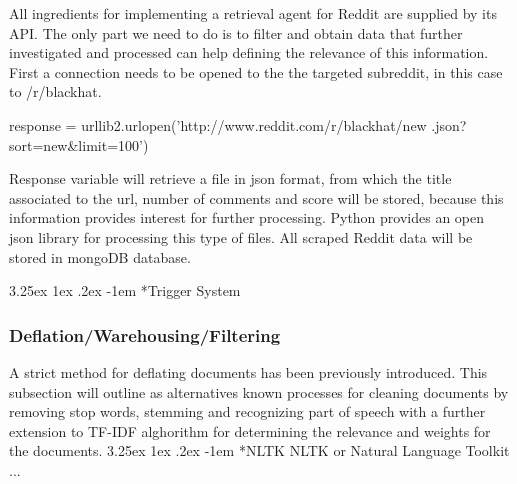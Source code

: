 \documentclass[12pt]{article}
\makeatletter
\newcounter{subsubsubsection}[subsubsection]
\renewcommand\paragraph{\@startsection{paragraph}{5}{\z@}%
  {3.25ex \@plus1ex \@minus.2ex}%
  {-1em}%
  {\normalfont\normalsize\bfseries}}
\makeatother
\begin{document}
All ingredients for implementing a retrieval agent for Reddit are supplied by its API. The only part we need to do is to filter and obtain data that further investigated and processed can help defining the relevance of this information. First a connection needs to be opened to the the targeted subreddit, in this case to /r/blackhat. 
\begin{spverbatim}
response = urllib2.urlopen('http://www.reddit.com/r/blackhat/new
			.json?sort=new&limit=100')
\end{spverbatim}
\hfill \break
Response variable will retrieve a file in json format, from which the title associated to the url, number of comments and score will be stored, because this information provides interest for further processing. Python provides an open json library for processing this type of files. All scraped Reddit data will be stored in mongoDB database. 

\paragraph*{Trigger System}
\subsubsection{Deflation/Warehousing/Filtering}
A strict method for deflating documents has been previously introduced. This subsection will outline as alternatives known processes for cleaning documents by removing stop words, stemming and recognizing part of speech with a further extension to TF-IDF alghorithm for determining the relevance and weights for the documents.
\paragraph*{NLTK}
NLTK or Natural Language Toolkit ...
\end{document}
